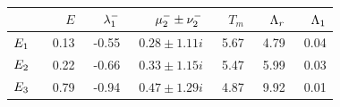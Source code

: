 \begin{table}[h!]
    \begin{tabular}{l|rrrrrr}
                & $E$   &$\eigExp[1]^-$ & $\eigRe[2]^-\pm\eigIm[2]^-$   & $T_m$ & $\ExpaEig_r$  & $\ExpaEig_1$  \\ \hline
        $\EQV{1}\ $ &\ 0.13 &\ -0.55    &\ $0.28\pm1.11i$       &\ 5.67     &\ 4.79     &\ 0.04 \\ \hline
        $\EQV{2}\ $     &\ 0.22 &\ -0.66    &\ $0.33\pm1.15i$       &\ 5.47     &\ 5.99     &\ 0.03 \\ \hline
        $\EQV{3}\ $     &\ 0.79 &\ -0.94    &\ $0.47\pm1.29i$       &\ 4.87     &\ 9.92     &\ 0.01
    \end{tabular}
    \caption{}
    \label{tab:L22cminus}
\end{table}


